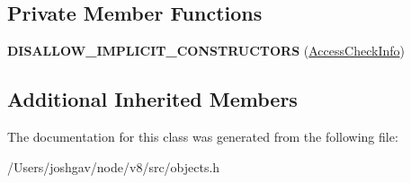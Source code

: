 \subsection*{Private Member Functions}
\begin{DoxyCompactItemize}
\item 
{\bfseries D\+I\+S\+A\+L\+L\+O\+W\+\_\+\+I\+M\+P\+L\+I\+C\+I\+T\+\_\+\+C\+O\+N\+S\+T\+R\+U\+C\+T\+O\+RS} (\hyperlink{classv8_1_1internal_1_1_access_check_info}{Access\+Check\+Info})\hypertarget{classv8_1_1internal_1_1_access_check_info_a95720e5a1661f82278ec82cd0e9b4c98}{}\label{classv8_1_1internal_1_1_access_check_info_a95720e5a1661f82278ec82cd0e9b4c98}

\end{DoxyCompactItemize}
\subsection*{Additional Inherited Members}


The documentation for this class was generated from the following file\+:\begin{DoxyCompactItemize}
\item 
/\+Users/joshgav/node/v8/src/objects.\+h\end{DoxyCompactItemize}
